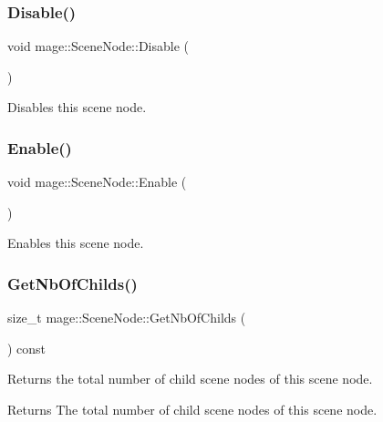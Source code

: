 \subsubsection{\texorpdfstring{Disable()}{Disable()}}
{\footnotesize\ttfamily void mage\+::\+Scene\+Node\+::\+Disable (\begin{DoxyParamCaption}{ }\end{DoxyParamCaption})}

Disables this scene node. \hypertarget{classmage_1_1_scene_node_a7fb08a122d822394a96a9c2bcf6aab7f}{}\label{classmage_1_1_scene_node_a7fb08a122d822394a96a9c2bcf6aab7f} 
\subsubsection{\texorpdfstring{Enable()}{Enable()}}
{\footnotesize\ttfamily void mage\+::\+Scene\+Node\+::\+Enable (\begin{DoxyParamCaption}{ }\end{DoxyParamCaption})}

Enables this scene node. \hypertarget{classmage_1_1_scene_node_a99c5eb3c253a2e620bd85ac845d3bb77}{}\label{classmage_1_1_scene_node_a99c5eb3c253a2e620bd85ac845d3bb77} 
\subsubsection{\texorpdfstring{Get\+Nb\+Of\+Childs()}{GetNbOfChilds()}}
{\footnotesize\ttfamily size\+\_\+t mage\+::\+Scene\+Node\+::\+Get\+Nb\+Of\+Childs (\begin{DoxyParamCaption}{ }\end{DoxyParamCaption}) const}

Returns the total number of child scene nodes of this scene node.

\begin{DoxyReturn}{Returns}
The total number of child scene nodes of this scene node. 
\end{DoxyReturn}
\hypertarget{classmage_1_1_scene_node_a4325660d42f5f393c77389a44aedb5cb}{}\label{classmage_1_1_scene_node_a4325660d42f5f393c77389a44aedb5cb} 
